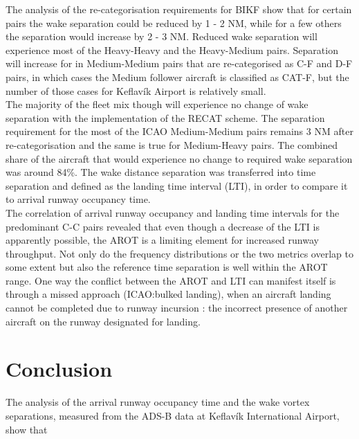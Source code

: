 The analysis of the re-categorisation requirements for BIKF show that for certain pairs the wake separation could be reduced by 1 - 2 NM, while for a few others the separation would increase by 2 - 3 NM. Reduced wake separation will experience most of the Heavy-Heavy and the Heavy-Medium pairs. Separation will increase for in Medium-Medium pairs that are re-categorised as C-F and D-F pairs, in which cases the Medium follower aircraft is classified as CAT-F, but the number of those cases for Keflavík Airport is relatively small.\\
The majority of the fleet mix though will experience no change of wake separation with the implementation of the RECAT scheme. The separation requirement for the most of the ICAO Medium-Medium pairs remains 3 NM after re-categorisation and the same is true for Medium-Heavy pairs. The combined share of the aircraft that would experience no change to required wake separation was around 84\%. The wake distance separation was transferred into time separation and defined as the landing time interval (LTI), in order to compare it to arrival runway occupancy time.\\
The correlation of arrival runway occupancy and landing time intervals for the predominant C-C pairs revealed that even though a decrease of the LTI is apparently possible, the AROT is a limiting element for increased runway throughput. Not only do the frequency distributions or the two metrics overlap to some extent but also the reference time separation is well within the AROT range. One way the conflict between the AROT and LTI can manifest itself is through a missed approach (ICAO:bulked landing), when an aircraft landing cannot be completed due to runway incursion \cite{doc44444}: the incorrect presence of another aircraft on the runway designated for landing.

\section{Conclusion\label{sec:conclusions}}
The analysis of the  arrival runway occupancy time and the wake vortex separations, measured from the ADS-B data at Keflavík International Airport, show that  




